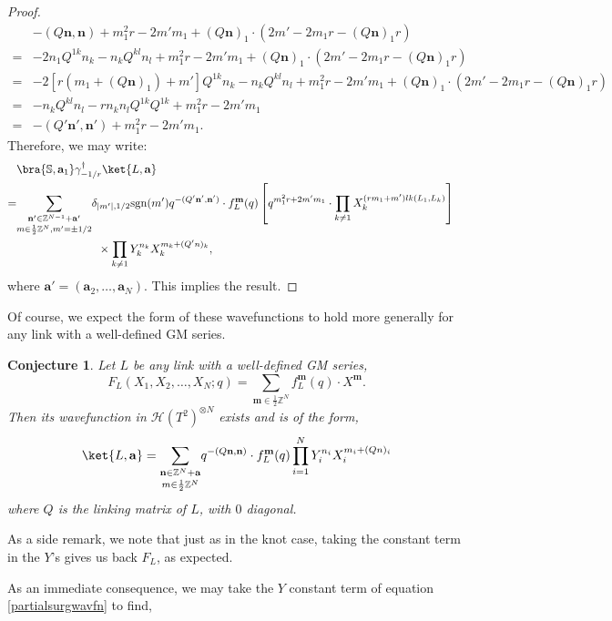 \documentclass{article}
\newcommand{\Z}{{\mathbb Z}}
\def\be{\begin{equation}}
\def\ee{\end{equation}}
\newtheorem{conjecture}{Conjecture}
\numberwithin{corollary}{theorem}
\numberwithin{corollary}{proposition}
\begin{document}
\begin{proof}
\begin{align*}
    & -(Q\mathbf{n},\mathbf{n}) + m_1^2 r - 2m'm_1+(Q\mathbf{n})_1 \cdot (2m' - 2m_1 r -(Q\mathbf{n})_1 r ) \\
    = & -2n_1Q^{1k}n_k -n_kQ^{kl}n_l + m_1^2 r - 2m'm_1+(Q\mathbf{n})_1 \cdot (2m' - 2m_1 r -(Q\mathbf{n})_1 r ) \\
    = & -2[r(m_1+(Q \mathbf{n})_1)+m']Q^{1k}n_k -n_kQ^{kl}n_l + m_1^2 r - 2m'm_1+(Q\mathbf{n})_1 \cdot (2m' - 2m_1 r -(Q\mathbf{n})_1 r ) \\
    = & -n_kQ^{kl}n_l - rn_kn_lQ^{1k}Q^{1k}+m_1^2r - 2m' m_1 \\
    = & -(Q'\mathbf{n'},\mathbf{n'})+ m_1^2r - 2m' m_1.
\end{align*}
Therefore, we may write:
\begin{align}\label{partialsurgwavfn}
   &  \bra{\mathbb{S},\mathbf{a}_1}\gamma_{-1/r}^\dagger\ket{L,\mathbf{a}} \endline
   = & \underset{m\in \frac{1}{2}\Z^N,m'=\pm 1/2}{\sum_{\mathbf{n}'\in \Z^{N-1}+\mathbf{a}'}}  \delta_{|m'|,1/2} \mathrm{sgn}(m')q^{-(Q'\mathbf{n'},\mathbf{n'})} \cdot f^\mathbf{m}_L(q) \left[q^{m_1^2r +2m' m_1} \cdot \prod_{k\neq 1} X^{(rm_1+m')lk(L_1,L_k)}_k\right] \endline & \hspace{2.5cm} \times \prod_{k\neq1} Y^{n_k}_k X_k^{m_k+(Q' n)_k},
\end{align}
where $\mathbf{a}' = (\mathbf{a}_2,\ldots,\mathbf{a}_{N})$. This implies the result.
\end{proof}

Of course, we expect the form of these wavefunctions to hold more generally for any link with a well-defined GM series. 
\begin{conjecture}\label{general_link_wavefun_conj}
Let $L$ be any link with a well-defined GM series,
$$F_L(X_1,X_2,\ldots,X_N;q) = \sum_{\mathbf{m}\in \frac{1}{2}\Z^N}f^\mathbf{m}_L(q) \cdot X^\mathbf{m}.$$
Then its wavefunction in $\mathcal{H}(T^2)^{\otimes N}$ exists and is of the form,
 \be \ket{L,\mathbf{a}} = \underset{m\in \frac{1}{2}\Z^N}{\sum_{\mathbf{n}\in \Z^N+\mathbf{a}}} q^{-(Q\mathbf{n},\mathbf{n})} \cdot f^\mathbf{m}_L(q) \prod^N_{i=1} Y^{n_i}_i X_i^{m_i+(Q n)_i} \label{general_link_wavfn} \ee
 where $Q$ is the linking matrix of $L$, with $0$ diagonal.  
\end{conjecture}

As a side remark, we note that just as in the knot case, taking the constant term in the $Y$'s gives us back $F_L$, as expected. 

As an immediate consequence, we may take the $Y$ constant term of equation \eqref{partialsurgwavfn} to find, 
\end{document}
